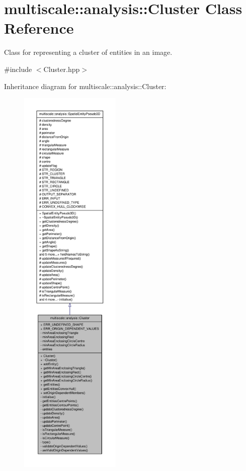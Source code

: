 \hypertarget{classmultiscale_1_1analysis_1_1Cluster}{\section{multiscale\-:\-:analysis\-:\-:\-Cluster \-Class \-Reference}
\label{classmultiscale_1_1analysis_1_1Cluster}
}


\-Class for representing a cluster of entities in an image.  




{\ttfamily \#include $<$\-Cluster.\-hpp$>$}



\-Inheritance diagram for multiscale\-:\-:analysis\-:\-:\-Cluster\-:\nopagebreak
\begin{figure}[H]
\begin{center}
\leavevmode
\includegraphics[height=550pt]{classmultiscale_1_1analysis_1_1Cluster__inherit__graph}
\end{center}
\end{figure}


